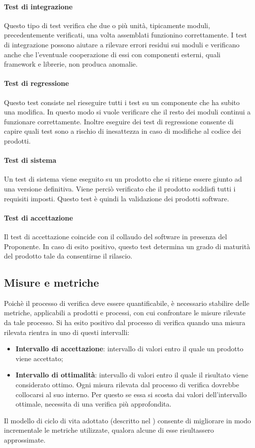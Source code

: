 \paragraph{Test di integrazione}
Questo tipo di test verifica che due o più unità, tipicamente moduli, precedentemente verificati, una volta assemblati funzionino correttamente. I test di integrazione possono aiutare a rilevare errori residui sui moduli e verificano anche che l’eventuale cooperazione di essi con componenti esterni, quali framework e librerie, non produca anomalie.

\paragraph{Test di regressione}
Questo test consiste nel rieseguire tutti i test su un componente che ha subito una modifica. In questo modo si vuole verificare che il resto dei moduli continui a funzionare correttamente. Inoltre eseguire dei test di regressione consente di capire quali test sono a rischio di inesattezza in caso di modifiche al codice dei prodotti.

\paragraph{Test di sistema}
Un test di sistema viene eseguito su un prodotto che si ritiene essere giunto ad una versione definitiva. Viene perciò verificato che il prodotto soddisfi tutti i requisiti imposti. Questo test è quindi la validazione dei prodotti software.

\paragraph{Test di accettazione}
Il test di accettazione coincide con il collaudo del software in presenza del Proponente. In caso di esito positivo, questo test determina un grado di maturità del prodotto tale da consentirne il rilascio.


\subsection{Misure e metriche}
Poichè il processo di verifica deve essere quantificabile, è necessario stabilire delle metriche, applicabili a prodotti e processi, con cui confrontare le misure rilevate da tale processo. Si ha esito positivo dal processo di verifica quando una misura rilevata rientra in uno di questi intervalli:
\begin{itemize}
\item \textbf{Intervallo di accettazione}: intervallo di valori entro il quale un prodotto viene accettato;
\item \textbf{Intervallo di ottimalità}: intervallo di valori entro il quale il risultato viene considerato ottimo. Ogni misura rilevata dal processo di verifica dovrebbe collocarsi al suo interno. Per questo se essa si scosta dai valori dell'intervallo ottimale, necessita di una verifica più approfondita.
\end{itemize} 
Il modello di ciclo di vita adottato (descritto nel \PdP) consente di migliorare in modo incrementale le metriche utilizzate, qualora alcune di esse risultassero approssimate.


